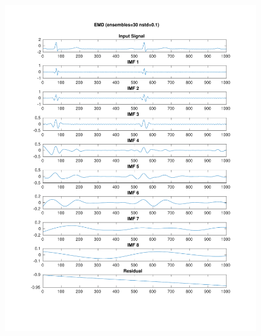 \documentclass[11pt,a4paper]{article}
\begin{document}
\begin{figure}[H]
\centering
\begin{minipage}{0.48\textwidth}
	\centering
	\includegraphics[width=\textwidth]{fig/123l1_emd_ensemble.pdf}
\end{minipage}
\begin{minipage}{0.48\textwidth}
	\centering

\end{minipage}
\end{figure}
\end{document}
